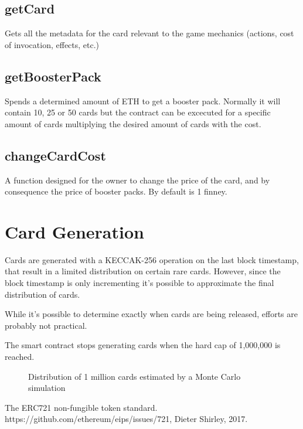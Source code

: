 \documentclass[11pt,twocolumn]{article}
\begin{document}
\subsection{getCard}
Gets all the metadata for the card relevant to the game mechanics (actions, cost of invocation, effects, etc.)
\subsection{getBoosterPack}
Spends a determined amount of ETH to get a booster pack. Normally it will contain 10, 25 or 50 cards but the contract can be excecuted for a specific amount of cards multiplying the desired amount of cards with the cost.
\subsection{changeCardCost}
A function designed for the owner to change the price of the card, and by consequence the price of booster packs. By default is 1 finney.
\section{Card Generation}
Cards are generated with a KECCAK-256 operation on the last block timestamp,  that result in a limited distribution on certain rare cards. However, since the block timestamp is only incrementing it's possible to approximate the final distribution of cards.

While it's possible to determine exactly when cards are being released, efforts are probably not practical. 

The smart contract stops generating cards when the hard cap of 1,000,000 is reached.
\begin{figure}[!htb]
\centering 
    
\caption{Distribution of 1 million cards estimated by a Monte Carlo simulation} \label{fig:A}
\end{figure}


\onecolumn

\begin{thebibliography}{1}

         The ERC721 non-fungible token standard. https://github.com/ethereum/eips/issues/721, Dieter Shirley, 2017.
      
        \end{thebibliography}
\end{document}
